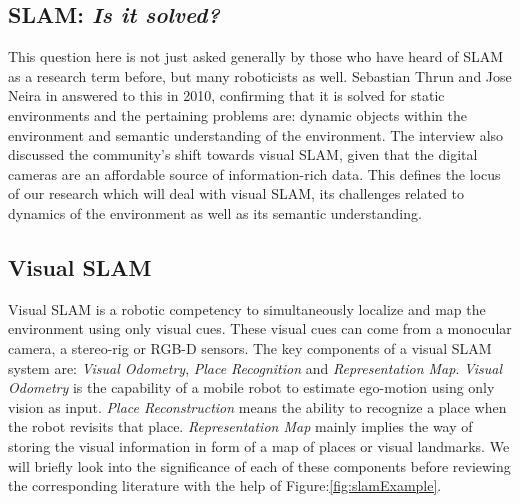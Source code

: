 \documentclass{article}
\begin{document}
\subsection{SLAM: \emph{Is it solved?}}
This question here is not just asked generally by those who have heard of SLAM as a research term before, but many roboticists as well. Sebastian Thrun and Jose Neira in \cite{frese2010interview} answered to this in 2010, confirming that it is solved for static environments and the pertaining problems are: dynamic objects within the environment and semantic understanding of the environment. The interview also discussed the community's shift towards visual SLAM, given that the digital cameras are an affordable source of information-rich data. This defines the locus of our research which will deal with visual SLAM, its challenges related to dynamics of the environment as well as its semantic understanding.

\subsection{Visual SLAM}
Visual SLAM is a robotic competency to simultaneously localize and map the environment using only visual cues. These visual cues can come from a monocular camera, a stereo-rig or RGB-D sensors. The key components of a visual SLAM system are: \emph{Visual Odometry}, \emph{Place Recognition} and \emph{Representation Map}. \emph{Visual Odometry} is the capability of a mobile robot to estimate ego-motion using only vision as input. \emph{Place Reconstruction} means the ability to recognize a place when the robot revisits that place. \emph{Representation Map} mainly implies the way of storing the visual information in form of a map of places or visual landmarks. We will briefly look into the significance of each of these components before reviewing the corresponding literature with the help of Figure:\ref{fig:slamExample}.
\end{document}
